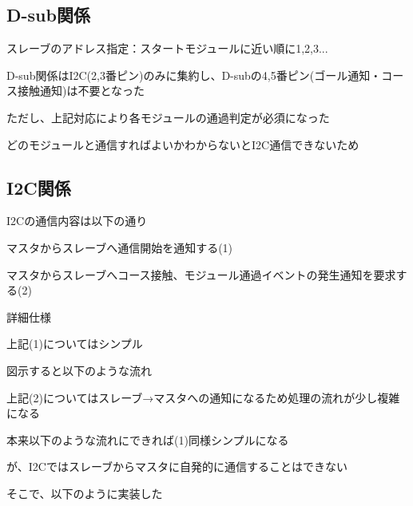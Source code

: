 \subsection*{D-\/sub関係}


\begin{DoxyItemize}
\item スレーブのアドレス指定：スタートモジュールに近い順に1,2,3...
\item D-\/sub関係は\+I2C(2,3番ピン)のみに集約し、\+D-\/subの4,5番ピン(ゴール通知・コース接触通知)は不要となった
\item ただし、上記対応により各モジュールの通過判定が必須になった
\begin{DoxyItemize}
\item どのモジュールと通信すればよいかわからないと\+I2\+C通信できないため
\end{DoxyItemize}
\end{DoxyItemize}

\subsection*{I2\+C関係}


\begin{DoxyItemize}
\item I2\+Cの通信内容は以下の通り
\begin{DoxyItemize}
\item マスタからスレーブへ通信開始を通知する(1)
\item マスタからスレーブへコース接触、モジュール通過イベントの発生通知を要求する(2)
\end{DoxyItemize}
\item 詳細仕様
\begin{DoxyItemize}
\item 上記(1)についてはシンプル
\begin{DoxyItemize}
\item 図示すると以下のような流れ


\end{DoxyItemize}
\item 上記(2)についてはスレーブ→マスタへの通知になるため処理の流れが少し複雑になる
\begin{DoxyItemize}
\item 本来以下のような流れにできれば(1)同様シンプルになる


\item が、\+I2\+Cではスレーブからマスタに自発的に通信することはできない
\item そこで、以下のように実装した


\end{DoxyItemize}
\end{DoxyItemize}
\end{DoxyItemize}

